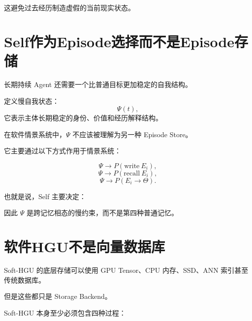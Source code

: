 这避免过去经历制造虚假的当前现实状态。

\section{Self作为Episode选择而不是Episode存储}

长期持续 Agent 还需要一个比普通目标更加稳定的自我结构。

定义慢自我状态：
\[
\Psi(t),
\]
它表示主体长期稳定的身份、价值和经历解释结构。

在软件情景系统中，$\Psi$ 不应该被理解为另一种 Episode Store。

它主要通过以下方式作用于情景系统：

\[
\Psi
\rightarrow
P(\mathrm{write}\ E_i),
\]
\[
\Psi
\rightarrow
P(\mathrm{recall}\ E_i),
\]
\[
\Psi
\rightarrow
P(E_i\rightarrow\Theta).
\]

也就是说，Self 主要决定：
\begin{statementbox}
\centering
{}
\end{statementbox}

因此 $\Psi$ 是跨记忆相态的慢约束，而不是第四种普通记忆。

\section{软件HGU不是向量数据库}

Soft-HGU 的底层存储可以使用 GPU Tensor、CPU 内存、SSD、ANN 索引甚至传统数据库。

但是这些都只是 Storage Backend。

Soft-HGU 本身至少必须包含四种过程：
\begin{statementbox}
\centering
{}
\end{statementbox}
\begin{statementbox}
\centering
{}
\end{statementbox}
\begin{statementbox}
\centering
{}
\end{statementbox}
\begin{statementbox}
\centering
{}
\end{statementbox}


